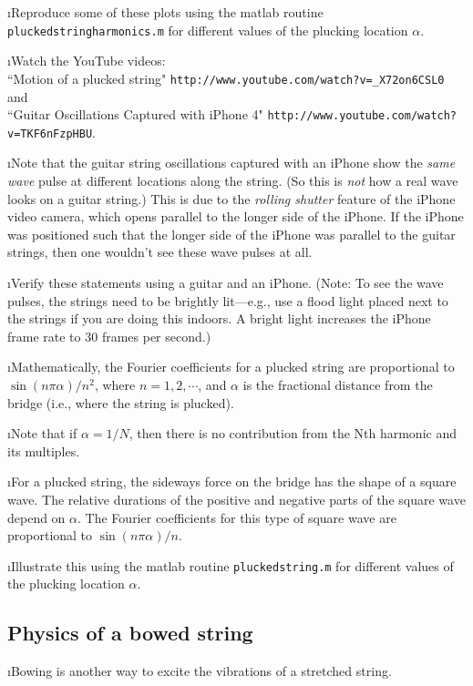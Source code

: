 \i \demo Reproduce some of these plots using the matlab
routine {\tt pluckedstringharmonics.m} for different
values of the plucking location $\alpha$.

\i \demo Watch the YouTube videos:\\
``Motion of a plucked string"
{\tt http://www.youtube.com/watch?v=\_X72on6CSL0} and\\
``Guitar Oscillations Captured with iPhone 4"
{\tt http://www.youtube.com/watch?v=TKF6nFzpHBU}.

\i Note that the guitar string oscillations captured 
with an iPhone show the {\em same wave} pulse at 
different locations along the string.
(So this is {\em not} how a real wave looks on a guitar string.)
This is due to the {\em rolling shutter} feature of 
the iPhone video camera, which opens parallel to the 
longer side of the iPhone.
If the iPhone was positioned such that the longer 
side of the iPhone was parallel to the guitar strings,
then one wouldn't see these wave pulses at all.

\i \demo Verify these statements using a guitar
and an iPhone.
(Note: To see the wave pulses, the strings need to
be brightly lit---e.g., use a flood light placed
next to the strings if you are doing this indoors.
A bright light increases the iPhone frame rate
to 30 frames per second.)

\i Mathematically, the Fourier coefficients for a plucked 
string are proportional to 
$\sin(n\pi\alpha)/n^2$, where $n=1,2,\cdots$,
and $\alpha$ is the fractional distance from the bridge
(i.e., where the string is plucked).

\i Note that if $\alpha = 1/N$, then there is 
no contribution from the Nth harmonic and its multiples.

\i For a plucked string, the sideways force on 
the bridge has the shape of a square wave.
The relative durations of the positive and negative 
parts of the square wave depend on $\alpha$.
The Fourier coefficients for this type of square 
wave are proportional to $\sin(n\pi\alpha)/n$.

\i \demo Illustrate this using the matlab
routine {\tt pluckedstring.m}
for different values of the plucking location $\alpha$.

\ei
\subsection{Physics of a bowed string}
\bi

\i Bowing is another way to excite the vibrations
of a stretched string.

